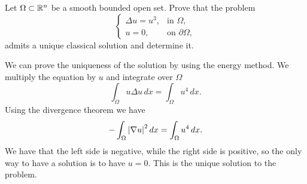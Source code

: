 \newpage
\begin{exercise}
    Let \(\Omega \subset \mathbb{R}^n\) be a smooth bounded open set. Prove that the problem
    \begin{equation*}
        \begin{cases}
            \Delta u = u^3, & \text{in } \Omega, \\
            u = 0, & \text{on } \partial \Omega,
        \end{cases}
    \end{equation*}
    admits a unique classical solution and determine it.
\end{exercise}
We can prove the uniqueness of the solution by using the energy method. We multiply the equation by \(u\) and integrate over \(\Omega\)
\[
    \int_\Omega u \Delta u \, dx = \int_\Omega u^4 \, dx.
\]
Using the divergence theorem we have
\[
    -\int_\Omega \abs{\nabla u}^2 \, dx = \int_\Omega u^4 \, dx.
\]
We have that the left side is negative, while the right side is positive, so the only way to have a solution is to have \(u = 0\). This is the unique solution to the problem.

\newpage
